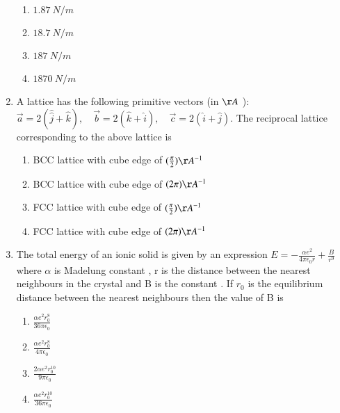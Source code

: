 \documentclass[journal]{IEEEtran}
\begin{document}
\begin{enumerate}
\begin{multicols}{4}
			\begin{enumerate}
   \item $1.87 {~N} / {m}$
\item $18.7 {~N} / {m}$
\item $187 {~N} / {m}$
\item $1870 {~N} / {m}$
\end{enumerate}
		\end{multicols}
  \item   A lattice has the following primitive vectors (in $\AA$ ): $\vec{a}=2(\hat{\hat j}+\hat{k}), \quad \vec{b}=2(\hat{k}+\hat{i}), \quad \vec{c}=2(\hat{i}+\hat{j})$. The reciprocal lattice corresponding to the above lattice is
 
			\begin{enumerate}
   \item BCC lattice with cube edge of $(\frac{\pi}{2}) \AA^{-1}$
\item BCC lattice with cube edge of $(2 \pi) \AA^{-1}$
\item FCC lattice with cube edge of $(\frac{\pi}{2}) \AA^{-1}$
\item FCC lattice with cube edge of $(2 \pi) \AA^{-1}$
			\end{enumerate}
\item The total energy of an ionic solid is given by an expression $E=-\frac{\alpha e^2}{4\pi\epsilon_0r}+\frac{B}{r^9}$ where $\alpha$ is Madelung constant , r is the distance between the nearest neighbours in the crystal and B is the constant . If $r_0$ is the equilibrium distance between the nearest neighbours then the value of B is 
\begin{enumerate}
	\item $\frac{\alpha e^2 r_0^8}{36\pi \epsilon_0}$
	\item$\frac{\alpha e^2 r_0^8}{4\pi \epsilon_0}$
	\item$\frac{2\alpha e^2 r_0^10}{9\pi \epsilon_0}$
	\item$\frac{\alpha e^2 r_0^10}{36\pi \epsilon_0}$


  \end{enumerate}
			\end{enumerate}	
 
\end{document}
